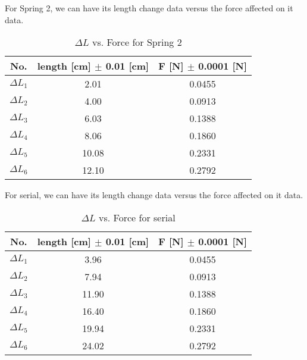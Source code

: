 For Spring 2, we can have its length change data versus the force affected on it
data.  

\begin{table}[H]
\centering
\begin{tabular}{|c|c|c|}
\hline
No. & length [cm] $\pm$ 0.01 [cm] & F [N] $\pm$ 0.0001 [N] \\ \hline
$\Delta L_1$ & 2.01  &  0.0455  \\ \hline
$\Delta L_2$ & 4.00  &  0.0913  \\ \hline
$\Delta L_3$ & 6.03  &  0.1388  \\ \hline
$\Delta L_4$ & 8.06  &  0.1860  \\ \hline
$\Delta L_5$ & 10.08 &  0.2331  \\ \hline
$\Delta L_6$ & 12.10 &  0.2792  \\ \hline
\end{tabular}
\caption{$\Delta L$  vs. Force for Spring 2}
\label{s2df}
\end{table}

For serial, we can have its length change data versus the force affected on it
data.  

\begin{table}[H]
\centering
\begin{tabular}{|c|c|c|}
\hline
No. & length [cm] $\pm$ 0.01 [cm] & F [N] $\pm$ 0.0001 [N] \\ \hline
$\Delta L_1$ & 3.96  &  0.0455  \\ \hline
$\Delta L_2$ & 7.94  &  0.0913  \\ \hline
$\Delta L_3$ & 11.90 &  0.1388  \\ \hline
$\Delta L_4$ & 16.40 &  0.1860  \\ \hline
$\Delta L_5$ & 19.94 &  0.2331  \\ \hline
$\Delta L_6$ & 24.02 &  0.2792  \\ \hline
\end{tabular}
\caption{$\Delta L$  vs. Force for serial}
\label{ssdf}
\end{table}
